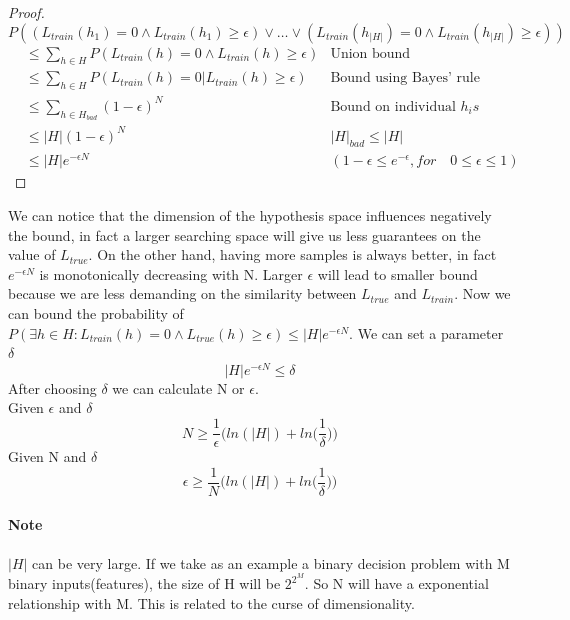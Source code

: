 \documentclass[main.tex]{subfiles}
\begin{document}
\newpage
\begin{proof}
    $$P((L_{train}(h_1)=0 \land L_{train}(h_1) \geq \epsilon) \lor \dots \lor (L_{train}(h_{|H|})=0 \land L_{train}(h_{|H|}) \geq \epsilon))$$
    \begin{align*}
         & \leq \sum_{h \in H} P(L_{train}(h)=0 \land L_{train}(h) \geq \epsilon) & \text{Union bound}                                               \\
         & \leq \sum_{h \in H} P(L_{train}(h)=0 | L_{train}(h) \geq \epsilon)     & \text{Bound using Bayes’ rule}                                   \\
         & \leq \sum_{h \in H_{bad}} (1-\epsilon)^N                               & \text{Bound on individual }h_is                                  \\
         & \leq |H|(1-\epsilon)^N                                                 & |H|_{bad}\leq|H|                                                 \\
         & \leq |H|e^{-\epsilon N}                                                & (1-\epsilon \leq e^{-\epsilon},for \quad 0 \leq \epsilon \leq 1)
    \end{align*}
\end{proof}
We can notice that the dimension of the hypothesis space influences negatively the bound, in fact a larger searching space will give us less guarantees on the value of $L_{true}$. On the other hand, having more samples is always better, in fact $e^{-\epsilon N}$ is monotonically decreasing with N. Larger $\epsilon$ will lead to smaller bound because we are less demanding on the similarity between $L_{true}$ and $L_{train}$.
Now we can bound the probability of $P(\exists h \in H: L_{train}(h)=0 \land L_{true}(h) \geq \epsilon) \leq |H|e^{-\epsilon N}$. We can set a parameter $\delta$
\begin{equation*}
    |H|e^{-\epsilon N} \leq \delta
\end{equation*}
After choosing $\delta$ we can calculate N or $\epsilon$.\\
Given $\epsilon$ and $\delta$
\begin{equation}
    N \geq \frac{1}{\epsilon} \bigg( ln(|H|) + ln \bigg( \frac{1}{\delta} \bigg) \bigg)
\end{equation}
Given N and $\delta$
\begin{equation}
    \epsilon \geq \frac{1}{N} \bigg( ln(|H|) + ln \bigg( \frac{1}{\delta} \bigg) \bigg)
\end{equation}
\paragraph{Note} $|H|$ can be very large. If we take as an example a binary decision problem with M binary inputs(features), the size of H will be $2^{2^M}$. So N will have a exponential relationship with M. This is related to the curse of dimensionality.
\end{document}
